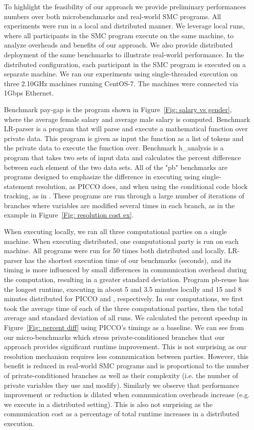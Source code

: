 To highlight the feasibility of our approach we provide preliminary performances numbers over both microbenchmarks and real-world SMC programs.  All experiments were run in a local and distributed manner.  We leverage local runs, where all participants in the SMC program execute on the same machine, to analyze overheads and benefits of our approach. We also  provide distributed deployment of the same benchmarks to illustrate real-world performance. In the distributed configuration, each participant in the SMC program is executed on a separate machine.
We ran our experiments using single-threaded execution on three 2.10GHz machines running CentOS-7. The machines were connected via 1Gbps Ethernet.  


Benchmark pay-gap is the program shown in Figure~\ref{Fig: salary vs gender}, where the average female salary and average male salary is computed.  
Benchmark LR-parser is a program that will parse and execute a mathematical function over private data. This program is given as input the function as a list of tokens and the private data to execute the function over.
Benchmark h\_analysis is a program that takes two sets of input data and calculates the percent difference between each element of the two data sets.
All of the "pb" benchmarks are programs designed to emphasize the difference in executing using single-statement resolution, as PICCO does, and when using the conditional code block tracking, as in \piccoC. These programs are run through a large number of iterations of branches where variables are modified several times in each branch, as in the example in Figure~\ref{Fig: resolution cost ex}.

When executing locally, we ran all three computational parties on a single machine. 
When executing distributed, one computational party is run on each machine. 
All programs were run for 50 times both distributed and locally. 
LR-parser has the shortest execution time of our benchmarks (seconds), and its timing is more influenced by small differences in communication overhead during the computation, resulting in a greater standard deviation. 
Program pb-reuse has the longest runtime, executing in about 5 and 3.5 minutes locally and 15 and 8 minutes distributed for PICCO and \piccoC, respectively. 
In our computations, we first took the average time of each of the three computational parties, then the total average and standard deviation of all runs. We calculated the percent speedup in Figure~\ref{Fig: percent diff} using PICCO's timings as a baseline.   We can see from our micro-benchmarks which stress private-conditioned branches that our approach provides significant runtime improvement.  This is not surprising as our resolution mechanism requires less
communication between parties.  However, this benefit is reduced in real-world SMC programs and is proportional to the number of private-conditioned branches as well as their complexity (i.e. the number of private variables they use and modify). Similarly we observe that performance improvement or reduction is dilated when communication overheads increase (e.g. we execute in a distributed setting).  This is also not surprising as the communication cost as a percentage of total runtime increases in a distributed execution.


